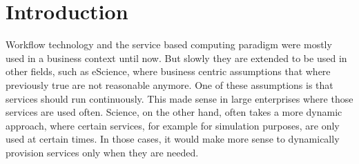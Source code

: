 \chapter{Introduction}

Workflow technology and the service based computing paradigm were mostly used in a business context until now.
But slowly they are extended to be used in other fields, such as eScience, where business centric assumptions that where previously true are not reasonable anymore.
One of these assumptions is that services should run continuously.
This made sense in large enterprises where those services are used often.
Science, on the other hand, often takes a more dynamic approach, where certain services, for example for simulation purposes, are only used at certain times.
In those cases, it would make more sense to dynamically provision services only when they are needed.



